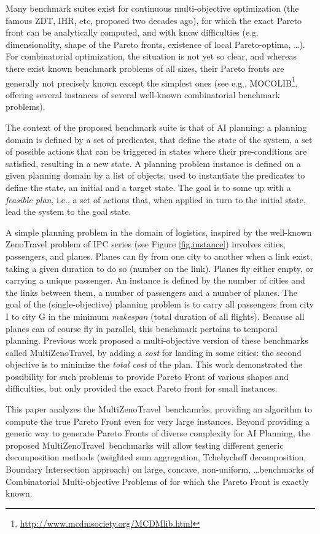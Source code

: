 \documentclass{llncs}
\def\ZENO{{\sc ZenoTravel}}
\def\MULTIZENO{{\sc MultiZenoTravel}}
\begin{document}
Many benchmark suites exist for continuous multi-objective optimization (the famous ZDT, IHR, etc, proposed two decades ago), for which the exact Pareto front can be analytically computed, and with know difficulties (e.g. dimensionality, shape of the Pareto fronts, existence of local Pareto-optima, \ldots). For combinatorial optimization, the situation is not yet so clear, and whereas there exist known benchmark problems of all sizes, their Pareto fronts are generally not precisely known except the simplest ones (see e.g., MOCOLIB\footnote{\url{http://www.mcdmsociety.org/MCDMlib.html}}, offering several instances of several well-known combinatorial benchmark problems).

The context of the proposed benchmark suite is that of AI planning: a planning domain is defined by a set of predicates, that define the state of the system, a set of possible actions that can be triggered in states where their pre-conditions are satisfied, resulting in a new state. A planning problem instance is defined on a given planning domain by a list of objects, used to instantiate the predicates to define the state, an initial and a target state. The goal is to some up with a {\em feasible plan}, i.e., a set of actions that, when applied in turn to the initial state, lead the system to the goal state.

A simple planning problem in the domain of logistics, inspired by the well-known {\ZENO} problem of IPC series (see Figure \ref{fig.instance}) involves cities, passengers, and planes. Planes can fly from one city to another when a link exist, taking a given duration to do so (number on the link). Planes fly either empty, or carrying a unique passenger. An instance is defined by the number of cities and the links between them, a number of passengers and a number of planes. The goal of the (single-objective) planning problem is to carry all passengers from city I to city G in the minimum {\em makespan} (total duration of all flights). Because all planes can of course fly in parallel, this benchmark pertains to temporal planning. Previous work \cite{khouadjia:hal-00750560} proposed a multi-objective version of these benchmarks called \MULTIZENO, by adding a {\em cost} for landing in some cities: the second objective is to minimize the {\em total cost} of the plan. This work demonstrated the possibility for such 
problems to provide Pareto Front of various shapes and difficulties, but only provided the exact Pareto front for small instances.

This paper analyzes the \MULTIZENO\ benchamrks, providing an algorithm to compute the true Pareto Front even for very large instances. Beyond providing a generic way to generate Pareto Fronts of diverse complexity for AI Planning, the proposed \MULTIZENO\ benchmarks will allow testing different generic decomposition methods (weighted sum aggregation, Tchebycheff decomposition, Boundary Intersection approach) on large, concave, non-uniform, \ldots benchmarks of Combinatorial Multi-objective Problems of for which the Pareto Front is exactly known. 
\end{document}
